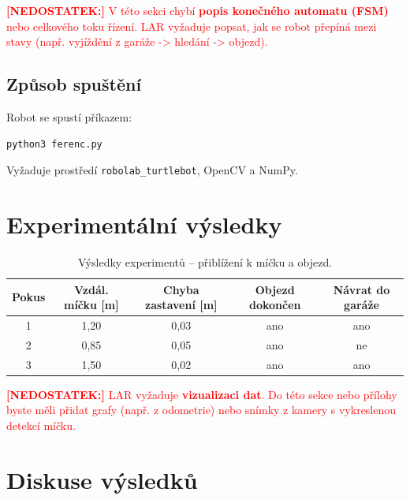 \documentclass[12pt, a4paper, oneside]{article}
\begin{document}
\textcolor{red}{\textbf{[NEDOSTATEK:]} V této sekci chybí \textbf{popis konečného automatu (FSM)} nebo celkového toku řízení. LAR vyžaduje popsat, jak se robot přepíná mezi stavy (např. vyjíždění z garáže -> hledání -> objezd).}

\subsection{Způsob spuštění}

Robot se spustí příkazem:

\begin{lstlisting}[language=bash, caption={Spuštění robota.}]
python3 ferenc.py
\end{lstlisting}

Vyžaduje prostředí \texttt{robolab\_turtlebot}, OpenCV a NumPy.

\section{Experimentální výsledky}
\label{sec:vysledky}

\begin{table}[H]
  \centering
  \caption{Výsledky experimentů – přiblížení k míčku a objezd.}
  \label{tab:vysledky}
  \begin{tabular}{ccccc}
    \toprule
    \textbf{Pokus} & \textbf{Vzdál. míčku [m]} & \textbf{Chyba zastavení [m]}
                    & \textbf{Objezd dokončen} & \textbf{Návrat do garáže} \\
    \midrule
    1 & 1{,}20 & 0{,}03 & ano & ano \\
    2 & 0{,}85 & 0{,}05 & ano & ne  \\
    3 & 1{,}50 & 0{,}02 & ano & ano \\
    \bottomrule
  \end{tabular}
\end{table}

\textcolor{red}{\textbf{[NEDOSTATEK:]} LAR vyžaduje \textbf{vizualizaci dat}. Do této sekce nebo přílohy byste měli přidat grafy (např. z odometrie) nebo snímky z kamery s vykreslenou detekcí míčku.}

\section{Diskuse výsledků}
\label{sec:diskuse}
\end{document}
